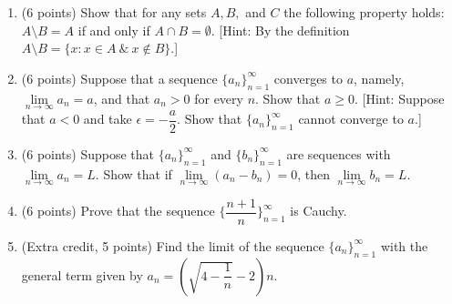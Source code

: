\documentclass[fleqn]{article}
\begin{document}
\begin{enumerate}
    

    \item (6 points) Show that for any sets $A, B,$ and $C$ the following property holds: 
    $A \setminus B=A$ if and only if $A \cap B=\emptyset$. 
    [Hint: By the definition $A \setminus B=\{x: x \in A ~ \& ~ x \notin B\}$.]




    \item (6 points) Suppose that a sequence $\{a_n\}_{n=1}^{\infty}$ converges to $a$, namely,
    $\lim\limits_{n\to\infty} a_n=a$, and that $a_n>0$ for every $n$. Show that $a\geq 0$. 
    [Hint: Suppose that $a<0$ and take $\epsilon=-\dfrac{a}{2}$. Show that $\{a_n\}_{n=1}^{\infty}$ cannot converge to $a$.]




    \item (6 points) Suppose that $\{a_n\}_{n=1}^{\infty}$ and $\{b_n\}_{n=1}^{\infty}$ are sequences with $\lim\limits_{n\to\infty} a_n=L$.
    Show that if $\lim\limits_{n\to\infty} (a_n-b_n)=0$, then $\lim\limits_{n\to\infty} b_n=L$.



    \item (6 points) Prove that the sequence $\{\dfrac{n+1}{n}\}_{n=1}^{\infty}$ is Cauchy.




    \item (Extra credit, 5 points) Find the limit of the sequence $\{a_n\}_{n=1}^{\infty}$ with the general term given by 
    $a_n=\left(\sqrt{4-\dfrac{1}{n}}-2\right)n$.



  \end{enumerate}
\end{document}
